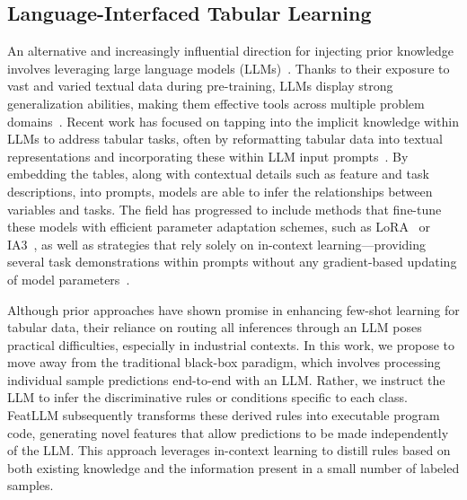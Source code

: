 \subsection{Language-Interfaced Tabular Learning} An alternative and increasingly influential direction for injecting prior knowledge involves leveraging large language models (LLMs)~\cite{anil2023palm,openai2023gpt4}. Thanks to their exposure to vast and varied textual data during pre-training, LLMs display strong generalization abilities, making them effective tools across multiple problem domains~\cite{brown2020language}. Recent work has focused on tapping into the implicit knowledge within LLMs to address tabular tasks, often by reformatting tabular data into textual representations and incorporating these within LLM input prompts~\cite{dinh2022lift,hegselmann2023tabllm,wang2023anypredict}. By embedding the tables, along with contextual details such as feature and task descriptions, into prompts, models are able to infer the relationships between variables and tasks. The field has progressed to include methods that fine-tune these models with efficient parameter adaptation schemes, such as LoRA~\cite{hu2021lora} or IA3~\cite{liu2022few}, as well as strategies that rely solely on in-context learning—providing several task demonstrations within prompts without any gradient-based updating of model parameters~\cite{dinh2022lift,hegselmann2023tabllm,nam2023semi,slack2023tablet}.

Although prior approaches have shown promise in enhancing few-shot learning for tabular data, their reliance on routing all inferences through an LLM poses practical difficulties, especially in industrial contexts. In this work, we propose to move away from the traditional black-box paradigm, which involves processing individual sample predictions end-to-end with an LLM. Rather, we instruct the LLM to infer the discriminative rules or conditions specific to each class. \textsf{FeatLLM} subsequently transforms these derived rules into executable program code, generating novel features that allow predictions to be made independently of the LLM. This approach leverages in-context learning to distill rules based on both existing knowledge and the information present in a small number of labeled samples.

